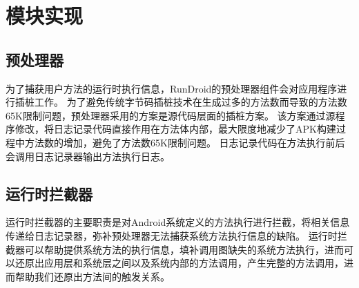 \section{模块实现}


\subsection{预处理器}

为了捕获用户方法的运行时执行信息，RunDroid的预处理器组件会对应用程序进行插桩工作。
为了避免传统字节码插桩技术在生成过多的方法数而导致的方法数65K限制问题，预处理器采用的方案是源代码层面的插桩方案。
该方案通过源程序修改，将日志记录代码直接作用在方法体内部，最大限度地减少了APK构建过程中方法数的增加，避免了方法数65K限制问题。
日志记录代码在方法执行前后会调用日志记录器输出方法执行日志。




\subsection{运行时拦截器}
运行时拦截器的主要职责是对Android系统定义的方法执行进行拦截，将相关信息传递给日志记录器，弥补预处理器无法捕获系统方法执行信息的缺陷。
运行时拦截器可以帮助提供系统方法的执行信息，填补调用图缺失的系统方法执行，进而可以还原出应用层和系统层之间以及系统内部的方法调用，产生完整的方法调用，进而帮助我们还原出方法间的触发关系。




